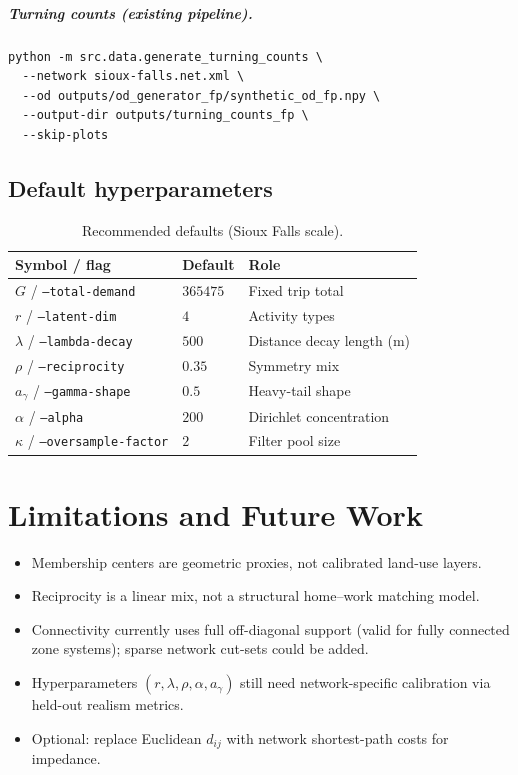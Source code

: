 \documentclass[11pt,a4paper]{report}
\begin{document}
\paragraph{Turning counts (existing pipeline).}
\begin{verbatim}
python -m src.data.generate_turning_counts \
  --network sioux-falls.net.xml \
  --od outputs/od_generator_fp/synthetic_od_fp.npy \
  --output-dir outputs/turning_counts_fp \
  --skip-plots
\end{verbatim}

\section{Default hyperparameters}

\begin{table}[ht]
\centering
\caption{Recommended defaults (Sioux Falls scale).}
\label{tab:fp-defaults}
\small
\begin{tabular}{@{}lll@{}}
\toprule
\textbf{Symbol / flag} & \textbf{Default} & \textbf{Role} \\
\midrule
$G$ / \texttt{--total-demand} & $365475$ & Fixed trip total \\
$r$ / \texttt{--latent-dim} & $4$ & Activity types \\
$\lambda$ / \texttt{--lambda-decay} & $500$ & Distance decay length (m) \\
$\rho$ / \texttt{--reciprocity} & $0.35$ & Symmetry mix \\
$a_\gamma$ / \texttt{--gamma-shape} & $0.5$ & Heavy-tail shape \\
$\alpha$ / \texttt{--alpha} & $200$ & Dirichlet concentration \\
$\kappa$ / \texttt{--oversample-factor} & $2$ & Filter pool size \\
\bottomrule
\end{tabular}
\end{table}


\chapter{Limitations and Future Work}
\label{ch:fp-limits}

\begin{itemize}[leftmargin=*]
    \item Membership centers are geometric proxies, not calibrated land-use layers.
    \item Reciprocity is a linear mix, not a structural home--work matching model.
    \item Connectivity currently uses full off-diagonal support (valid for fully connected zone systems); sparse network cut-sets could be added.
    \item Hyperparameters $(r,\lambda,\rho,\alpha,a_\gamma)$ still need network-specific calibration via held-out realism metrics.
    \item Optional: replace Euclidean $d_{ij}$ with network shortest-path costs for impedance.
\end{itemize}
\end{document}
